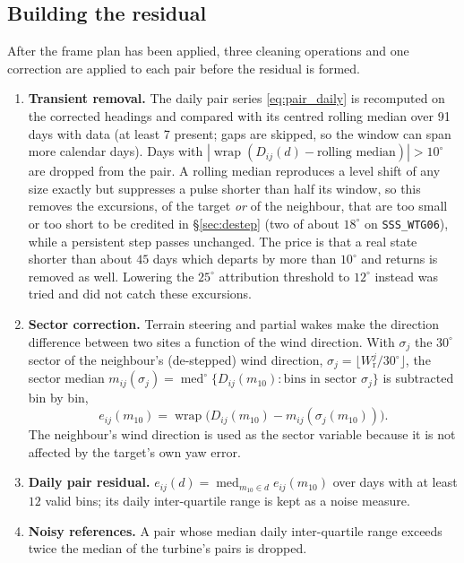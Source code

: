 \documentclass[11pt,a4paper]{article}
\theoremstyle{remark}
\newcommand{\wrap}{\operatorname{wrap}}
\newcommand{\med}{\operatorname{med}}
\newcommand{\cmed}{\operatorname{med}^{\circ}}
\newcommand{\dg}{^{\circ}}
\newcommand{\code}[1]{\texttt{#1}}
\newcommand{\Wr}{W_{\mathrm{r}}}
\begin{document}
\subsection{Building the residual}\label{sec:cons_build}
After the frame plan has been applied, three cleaning operations and one
correction are applied to each pair before the residual is formed.
\begin{enumerate}
\item \textbf{Transient removal.} The daily pair series \eqref{eq:pair_daily}
      is recomputed on the corrected headings and compared with its centred
      rolling median over 91 days with data (at least 7 present; gaps are skipped, so the window can span more calendar days). Days with
      $|\wrap(D_{ij}(d) - \text{rolling median})| > 10\dg$ are dropped from the
      pair. A rolling median reproduces a level shift of any size exactly but
      suppresses a pulse shorter than half its window, so this removes the
      excursions, of the target \emph{or} of the neighbour, that are too small
      or too short to be credited in \S\ref{sec:destep} (two of about $18\dg$
      on \code{SSS\_WTG06}), while a persistent step passes unchanged. The
      price is that a real state shorter than about $45$ days which departs by
      more than $10\dg$ and returns is removed as well. Lowering the
      $25\dg$ attribution threshold to $12\dg$ instead was tried and did not
      catch these excursions.
\item \textbf{Sector correction.} Terrain steering and partial wakes make the
      direction difference between two sites a function of the wind direction.
      With $\sigma_j$ the $30\dg$ sector of the neighbour's (de-stepped) wind
      direction, $\sigma_j = \lfloor \Wr^j / 30\dg\rfloor$, the sector median
      $m_{ij}(\sigma_j) = \cmed\{D_{ij}(m_{10}) : \text{bins in sector } \sigma_j\}$
      is subtracted bin by bin,
      \begin{equation}
        e_{ij}(m_{10}) = \wrap\big(D_{ij}(m_{10}) - m_{ij}(\sigma_j(m_{10}))\big) .
        \label{eq:sector}
      \end{equation}
      The neighbour's wind direction is used as the sector variable because it
      is not affected by the target's own yaw error.
\item \textbf{Daily pair residual.} $e_{ij}(d) = \med_{m_{10}\in d} e_{ij}(m_{10})$
      over days with at least $12$ valid bins; its daily inter-quartile range is
      kept as a noise measure.
\item \textbf{Noisy references.} A pair whose median daily inter-quartile range
      exceeds twice the median of the turbine's pairs is dropped.
\end{enumerate}
\end{document}
